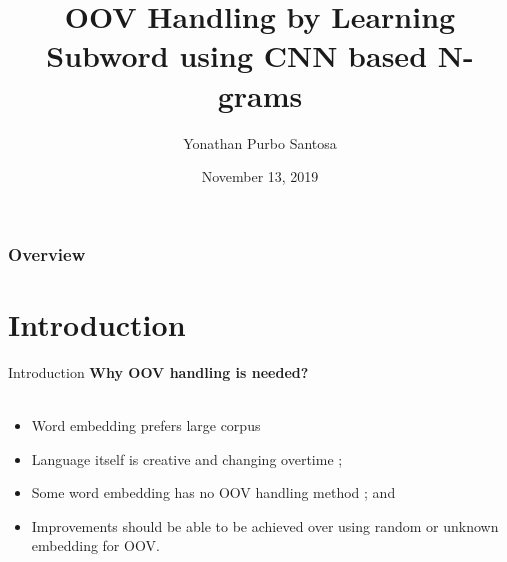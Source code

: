 \documentclass{beamer}
\title[Short title]{OOV Handling by Learning Subword using CNN based N-grams} %
\author{Yonathan Purbo Santosa} %
\institute[Institut f{\"u}r Informatik] %
{
Institut f{\"u}r Informatik\\
Rheinische Friedrich-Wilhelms-Universit{\"a}t Bonn %
\medskip
}
\date{November 13, 2019} %
\begin{document}
\begin{frame}
\titlepage %
\end{frame}

\begin{frame}
\frametitle{Overview} %
\tableofcontents %
\end{frame}


\section{Introduction}
\begin{frame}{Introduction}
    \textbf{Why OOV handling is needed?}\\~\\

    \begin{itemize}
        \item Word embedding prefers large corpus \cite{size2018kutuzov}
        \item Language itself is creative and changing overtime
        \cite{forrester2008abrief, speech2009Jurafsky};
        \item Some word embedding has no OOV handling method
        \cite{polyglot2013alrfo, dict2vect2017tissier, efficient2013mikolov}; and 
        \item Improvements should be able to be achieved over using
        random or unknown embedding for OOV.
    \end{itemize}
\end{frame}
\end{document}
